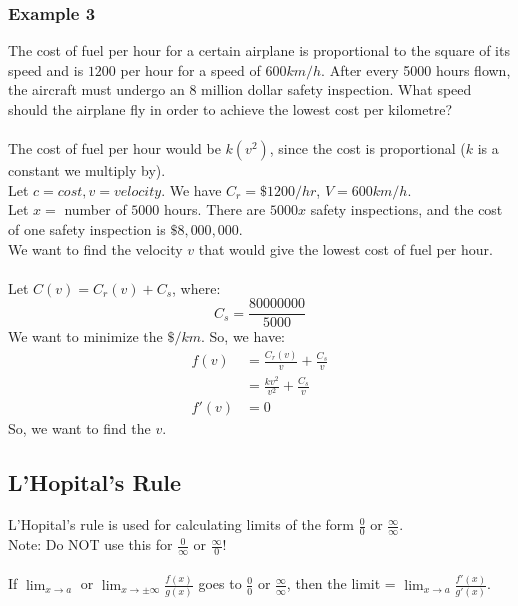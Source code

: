 \documentclass{article}
\begin{document}
\subsubsection{Example 3}
The cost of fuel per hour for a certain airplane is proportional to the square of its speed and is $1200$ per hour for a speed of $600km/h$. After every 5000 hours flown, the aircraft must undergo an $8$ million dollar safety inspection. What speed should the airplane fly in order to achieve the lowest cost per kilometre?\\
\\
The cost of fuel per hour would be $k(v^2)$, since the cost is proportional ($k$ is a constant we multiply by).\\
Let $c = cost, v = velocity$. We have $C_r = \$1200/hr$,  $V = 600km/h$.\\
Let $x =$ number of $5000$ hours. There are $5000x$ safety inspections, and the cost of one safety inspection is $\$8 ,000,000$.\\
We want to find the velocity $v$ that would give the lowest cost of fuel per hour.\\
\\
Let $C(v) = C_r(v) + C_s$, where:
$$C_s = \frac{80000000}{5000}$$
We want to minimize the $\$/km$. So, we have:
\begin{align*}
    f(v) & = \frac{C_r(v)}{v} + \frac{C_s}{v}\\
    & = \frac{kv^2}{v^2} + \frac{C_s}{v}\\
    f'(v) & = 0
\end{align*}
So, we want to find the $v$.

\subsection{L'Hopital's Rule}
L'Hopital's rule is used for calculating limits of the form $\frac{0}{0}$ or $\frac{\infty}{\infty}$.\\
Note: Do NOT use this for $\frac{0}{\infty}$ or $\frac{\infty}{0}$!\\
\\
If $\lim_{x \to a}$ or $\lim_{x \to \pm \infty} \frac{f(x)}{g(x)}$ goes to $\frac{0}{0}$ or $\frac{\infty}{\infty}$, then the limit = $\lim_{x \to a} \frac{f'(x)}{g'(x)}$.
\end{document}
